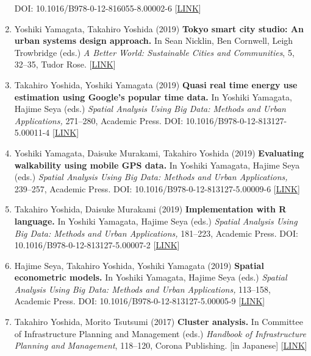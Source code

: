 \documentclass[
]{book}
\begin{document}
\begin{enumerate}
  DOI: 10.1016/B978-0-12-816055-8.00002-6 {[}\href{https://www.elsevier.com/books/urban-systems-design/yamagata/978-0-12-816055-8}{LINK}{]}
\item
  Yoshiki Yamagata, Takahiro Yoshida (2019)
  \textbf{Tokyo smart city studio: An urban systems design approach.}
  In Sean Nicklin, Ben Cornwell, Leigh Trowbridge (eds.)
  \emph{A Better World: Sustainable Cities and Communities}, 5, 32--35, Tudor Rose.
  {[}\href{http://unhabitat.org.mm/publications/a-better-world-volume-5/}{LINK}{]}
\item
  Takahiro Yoshida, Yoshiki Yamagata (2019)
  \textbf{Quasi real time energy use estimation using Google's popular time data.}
  In Yoshiki Yamagata, Hajime Seya (eds.)
  \emph{Spatial Analysis Using Big Data: Methods and Urban Applications,} 271--280, Academic Press.
  DOI: 10.1016/B978-0-12-813127-5.00011-4 {[}\href{https://www.elsevier.com/books/spatial-analysis-using-big-data/yamagata/978-0-12-813127-5}{LINK}{]}
\item
  Yoshiki Yamagata, Daisuke Murakami, Takahiro Yoshida (2019)
  \textbf{Evaluating walkability using mobile GPS data.}
  In Yoshiki Yamagata, Hajime Seya (eds.)
  \emph{Spatial Analysis Using Big Data: Methods and Urban Applications,} 239--257, Academic Press.
  DOI: 10.1016/B978-0-12-813127-5.00009-6 {[}\href{https://www.elsevier.com/books/spatial-analysis-using-big-data/yamagata/978-0-12-813127-5}{LINK}{]}
\item
  Takahiro Yoshida, Daisuke Murakami (2019)
  \textbf{Implementation with R language.}
  In Yoshiki Yamagata, Hajime Seya (eds.)
  \emph{Spatial Analysis Using Big Data: Methods and Urban Applications,} 181--223, Academic Press.
  DOI: 10.1016/B978-0-12-813127-5.00007-2 {[}\href{https://www.elsevier.com/books/spatial-analysis-using-big-data/yamagata/978-0-12-813127-5}{LINK}{]}
\item
  Hajime Seya, Takahiro Yoshida, Yoshiki Yamagata (2019)
  \textbf{Spatial econometric models.}
  In Yoshiki Yamagata, Hajime Seya (eds.)
  \emph{Spatial Analysis Using Big Data: Methods and Urban Applications,} 113--158, Academic Press.
  DOI: 10.1016/B978-0-12-813127-5.00005-9 {[}\href{https://www.elsevier.com/books/spatial-analysis-using-big-data/yamagata/978-0-12-813127-5}{LINK}{]}
\item
  Takahiro Yoshida, Morito Tsutsumi (2017)
  \textbf{Cluster analysis.}
  In Committee of Infrastructure Planning and Management (eds.)
  \emph{Handbook of Infrastructure Planning and Management}, 118--120, Corona Publishing.
  {[}in Japanese{]} {[}\href{http://www.coronasha.co.jp/doboku-hb.html}{LINK}{]}
\end{enumerate}
\end{document}
